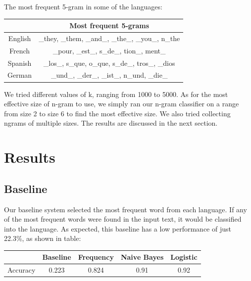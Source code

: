 \documentclass[11pt]{article}
\begin{document}
The most frequent 5-gram in some of the languages:\\
\begin{center}
\begin{tabular}{|c|c|}
\hline 
  & Most frequent 5-grams \\ 
\hline 
English & \_they, \_them, \_and\_, \_the\_, \_you\_, n\_the \\ 
\hline 
French & \_pour, \_est\_, s\_de\_, tion\_, ment\_ \\ 
\hline 
Spanish & \_los\_, s\_que, o\_que, s\_de\_, tros\_, \_dios \\ 
\hline 
German & \_und\_, \_der\_, \_ist\_, n\_und, \_die\_ \\ 
\hline 
\end{tabular} 
\end{center}
We tried different values of k, ranging from 1000 to 5000.
As for the most effective size of n-gram to use, we simply
ran our n-gram classifier on a range from size 2 to size 6
to find the most effective size. We also tried collecting ngrams
of multiple sizes. The results are discussed in the next
section.

\section{Results}
\subsection{Baseline}
Our baseline system selected the most frequent word from
each language. If any of the most frequent words were found
in the input text, it would be classified into the language. As
expected, this baseline has a low performance of just 22.3\%,
as shown in table:\\
\begin{tabular}{|c|c|c|c|c|}
\hline 
 & Baseline & Frequency & Naive Bayes & Logistic \\ 
\hline 
Accuracy & 0.223 & 0.824 & 0.91 & 0.92 \\ 
\hline 
\end{tabular} 
\end{document}
